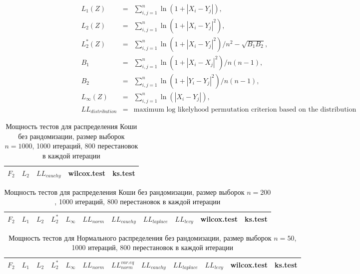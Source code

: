 \documentclass{article}
\begin{document}
\begin{eqnarray}
  L_1(Z)&=&\sum_{i,j=1}^{n}{\ln(1+|X_{i}-Y_{j}|)},\\
  L_2(Z)&=&\sum_{i,j=1}^{n}{\ln(1+|X_{i}-Y_{j}|^2)},\\
  L_2^*(Z)&=&\sum_{i,j=1}^{n}{\ln(1+|X_{i}-Y_{j}|^2)}/n^2-\sqrt{B_1 B_2},\\
  B_1 &=& \sum_{i,j=1}^{n}{\ln(1+|X_{i}-X_{j}|^2)}/n(n-1),\\
  B_2 &=& \sum_{i,j=1}^{n}{\ln(1+|Y_{i}-Y_{j}|^2)}/n(n-1),\\
  L_\infty(Z)&=&\sum_{i,j=1}^{n}{\ln(|X_{i}-Y_{j}|)},\\
  LL_{distribution} &=& \text{maximum log likelyhood permutation criterion based on the distribution}
\end{eqnarray}

\begin{longtable}{|c|c|c|c|c|}
  \caption{Мощность тестов для распределения Коши без рандомизации, размер выборок $n=1000$, 1000 итераций, 800 перестановок в каждой итерации}
  \label{table:n50} \\
  \hline
  $F_2$ & $L_{2}$ & $LL_{cauchy}$ & wilcox.test & ks.test \\ \hline
  
  \hline
\end{longtable}

\begin{longtable}{|c|c|c|c|c|c|c|c|c|c|c|}
  \caption{Мощность тестов для распределения Коши без рандомизации, размер выборок $n=200$, 1000 итераций, 800 перестановок в каждой итерации}
  \label{table:n50} \\
  \hline
  $F_2$ & $L_{1}$ & $L_{2}$ & $L_2^*$ & $L_{\infty}$ & $LL_{norm}$ & $LL_{cauchy}$ & $LL_{laplace}$ & $LL_{levy}$ & wilcox.test & ks.test \\ \hline
  
\end{longtable}

\newpage

\begin{longtable}{|c|c|c|c|c|c|c|c|c|c|c|c|}
  \caption{Мощность тестов для Нормального распределения без рандомизации, размер выборок $n=50$, 1000 итераций, 800 перестановок в каждой итерации}
  \label{table:n50} \\
  \hline
  $F_2$ & $L_{1}$ & $L_{2}$ & $L_2^*$ & $L_{\infty}$ & $LL_{norm}$ & $LL_{norm}^{var.eq}$ & $LL_{cauchy}$ & $LL_{laplace}$ & $LL_{levy}$ & wilcox.test & ks.test \\ \hline
  
\end{longtable}
\end{document}
